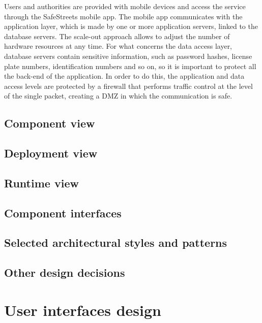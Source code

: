 \documentclass[12pt,a4paper]{report}
\begin{document}
	Users and authorities are provided with mobile devices and access the service through
	the SafeStreets mobile app. The mobile app communicates with the application layer, which
	is made by one or more application servers, linked to the database servers. The scale-out approach allows to adjust the number of hardware resources at any time. For what concerns the data access layer, database servers contain sensitive information, such as password hashes, license plate numbers, identification numbers and so on, so it is important to protect all the back-end of the application. In order to do this, the application and data access levels are protected by a firewall that performs traffic control at the level of the single packet, creating a DMZ in which the communication is safe.

		\section{Component view}
		\section{Deployment view}
		\section{Runtime view}
		\section{Component interfaces}
		\section{Selected architectural styles and patterns}
		\section{Other design decisions}
	
	\chapter{User interfaces design}
\end{document}
